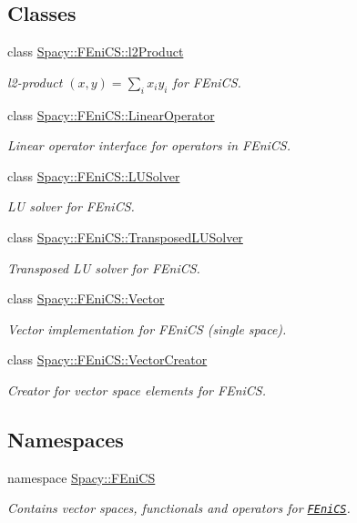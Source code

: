 \subsection*{\-Classes}
\begin{DoxyCompactItemize}
\item 
class \hyperlink{classSpacy_1_1FEniCS_1_1l2Product}{\-Spacy\-::\-F\-Eni\-C\-S\-::l2\-Product}
\begin{DoxyCompactList}\small\item\em l2-\/product $(x,y) = \sum_i x_i y_i $ for \-F\-Eni\-C\-S. \end{DoxyCompactList}\item 
class \hyperlink{classSpacy_1_1FEniCS_1_1LinearOperator}{\-Spacy\-::\-F\-Eni\-C\-S\-::\-Linear\-Operator}
\begin{DoxyCompactList}\small\item\em \-Linear operator interface for operators in \-F\-Eni\-C\-S. \end{DoxyCompactList}\item 
class \hyperlink{classSpacy_1_1FEniCS_1_1LUSolver}{\-Spacy\-::\-F\-Eni\-C\-S\-::\-L\-U\-Solver}
\begin{DoxyCompactList}\small\item\em \-L\-U solver for \-F\-Eni\-C\-S. \end{DoxyCompactList}\item 
class \hyperlink{classSpacy_1_1FEniCS_1_1TransposedLUSolver}{\-Spacy\-::\-F\-Eni\-C\-S\-::\-Transposed\-L\-U\-Solver}
\begin{DoxyCompactList}\small\item\em \-Transposed \-L\-U solver for \-F\-Eni\-C\-S. \end{DoxyCompactList}\item 
class \hyperlink{classSpacy_1_1FEniCS_1_1Vector}{\-Spacy\-::\-F\-Eni\-C\-S\-::\-Vector}
\begin{DoxyCompactList}\small\item\em \-Vector implementation for \-F\-Eni\-C\-S (single space). \end{DoxyCompactList}\item 
class \hyperlink{classSpacy_1_1FEniCS_1_1VectorCreator}{\-Spacy\-::\-F\-Eni\-C\-S\-::\-Vector\-Creator}
\begin{DoxyCompactList}\small\item\em \-Creator for vector space elements for \-F\-Eni\-C\-S. \end{DoxyCompactList}\end{DoxyCompactItemize}
\subsection*{\-Namespaces}
\begin{DoxyCompactItemize}
\item 
namespace \hyperlink{namespaceSpacy_1_1FEniCS}{\-Spacy\-::\-F\-Eni\-C\-S}
\begin{DoxyCompactList}\small\item\em \-Contains vector spaces, functionals and operators for \href{www.fenicsproject.org}{\tt \-F\-Eni\-C\-S}. \end{DoxyCompactList}\end{DoxyCompactItemize}
